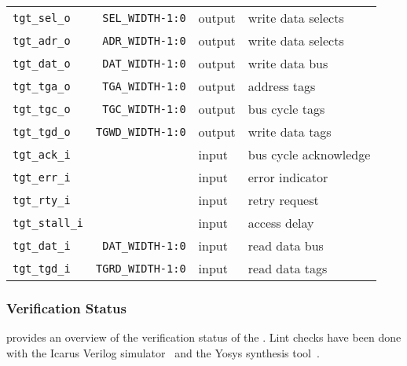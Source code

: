 \begin{center}
\begin{longtable}{|l|r|l|l|}
    \texttt{tgt\_sel\_o}         & \texttt{SEL\_WIDTH-1:0}  & output & write data selects        \\
    \texttt{tgt\_adr\_o}         & \texttt{ADR\_WIDTH-1:0}  & output & write data selects        \\
    \texttt{tgt\_dat\_o}         & \texttt{DAT\_WIDTH-1:0}  & output & write data bus            \\
    \texttt{tgt\_tga\_o}         & \texttt{TGA\_WIDTH-1:0}  & output & address tags              \\
    \texttt{tgt\_tgc\_o}         & \texttt{TGC\_WIDTH-1:0}  & output & bus cycle tags            \\
    \texttt{tgt\_tgd\_o}         & \texttt{TGWD\_WIDTH-1:0} & output & write data tags           \\
    \texttt{tgt\_ack\_i}         &                          & input  & bus cycle acknowledge     \\
    \texttt{tgt\_err\_i}         &                          & input  & error indicator           \\
    \texttt{tgt\_rty\_i}         &                          & input  & retry request             \\
    \texttt{tgt\_stall\_i}       &                          & input  & access delay              \\
    \texttt{tgt\_dat\_i}         & \texttt{DAT\_WIDTH-1:0}  & input  & read data bus             \\
    \texttt{tgt\_tgd\_i}         & \texttt{TGRD\_WIDTH-1:0} & input  & read data tags            \\   
  \end{longtable}
\end{center}  
\endgroup

\subsubsection{Verification Status}
\label{stand:verif}

 provides an overview of the verification status of the .
Lint checks have been done with the Icarus Verilog simulator~\cite{iverilog} and the Yosys synthesis tool~\cite{yosys}.

